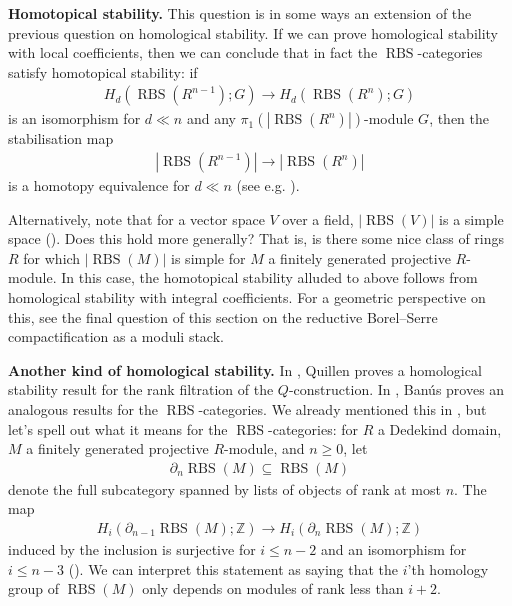 \documentclass[12pt, reqno]{amsart}
\theoremstyle{plain}
\theoremstyle{definition}
\newcommand{\Z}{\mathbb Z}
\begin{document}
\textbf{Homotopical stability.} This question is in some ways an extension of the previous question on homological stability. If we can prove homological stability with local coefficients, then we can conclude that in fact the $\operatorname{RBS}$-categories satisfy homotopical stability: if
\begin{align*}
H_d(\operatorname{RBS}(R^{n-1}); G)\longrightarrow H_d(\operatorname{RBS}(R^{n}); G)
\end{align*}
is an isomorphism for $d\ll n$ and any $\pi_1(|\operatorname{RBS}(R^{n})|)$-module $G$, then the stabilisation map
\begin{align*}
|\operatorname{RBS}(R^{n-1})|\longrightarrow |\operatorname{RBS}(R^{n})|
\end{align*}
is a homotopy equivalence for $d\ll n$ (see e.g. \cite[Lemma 1.6, Chapter IV]{Weibel99}).

Alternatively, note that for a vector space $V$ over a field, $|\operatorname{RBS}(V)|$ is a simple space (\cite[Theorem 1.3 and Theorem 1.4]{ClausenOrsnesJansen}). Does this hold more generally? That is, is there some nice class of rings $R$ for which $|\operatorname{RBS}(M)|$ is simple for $M$ a finitely generated projective $R$-module. In this case, the homotopical stability alluded to above follows from homological stability with integral coefficients. For a geometric perspective on this, see the final question of this section on the reductive Borel--Serre compactification as a moduli stack.

\medskip

\textbf{Another kind of homological stability.} In \cite{Quillen73a}, Quillen proves a homological stability result for the rank filtration of the $Q$-construction. In \cite{Damia}, Banús proves an analogous results for the $\operatorname{RBS}$-categories. We already mentioned this in , but let's spell out what it means for the $\operatorname{RBS}$-categories: for $R$ a Dedekind domain, $M$ a finitely generated projective $R$-module, and $n\geq 0$, let
\begin{align*}
\partial_n\operatorname{RBS}(M)\subseteq\operatorname{RBS}(M)
\end{align*}
denote the full subcategory spanned by lists of objects of rank at most $n$. The map
\begin{align*}
H_i(\partial_{n-1}\operatorname{RBS}(M);\Z) \rightarrow H_i(\partial_n\operatorname{RBS}(M);\Z)
\end{align*}
induced by the inclusion is surjective for $i\leq n-2$ and an isomorphism for $i\leq n-3$ (\cite[Theorem 4.2.1]{Damia}). We can interpret this statement as saying that the $i$'th homology group of $\operatorname{RBS}(M)$ only depends on modules of rank less than $i+2$.
\end{document}
